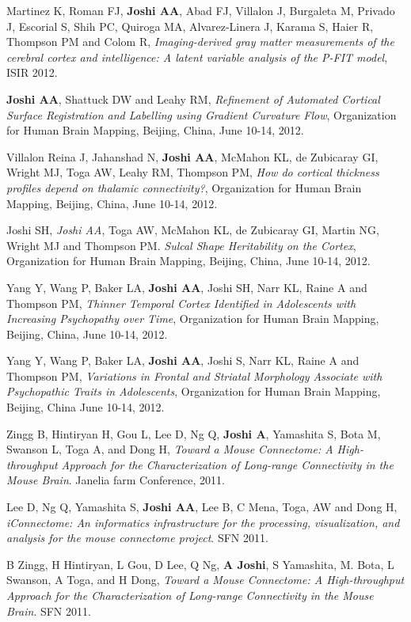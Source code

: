 \documentclass[overlapped,line,letterpaper]{res}
\begin{document}
\begin{resume}
Martinez K, Roman FJ, \textbf{Joshi AA}, Abad FJ, Villalon J, Burgaleta M, Privado J, Escorial S, Shih PC, Quiroga MA, Alvarez-Linera J, Karama S, Haier R, Thompson PM and Colom R, \textit{Imaging-derived gray matter measurements of the cerebral cortex and intelligence: A latent variable analysis of the P-FIT model}, ISIR 2012.

\textbf{Joshi AA}, Shattuck DW and Leahy RM, \textit{Refinement of Automated Cortical Surface Registration and Labelling using Gradient Curvature Flow}, Organization for Human Brain Mapping, Beijing, China, June 10-14, 2012.

Villalon Reina J, Jahanshad N, \textbf{Joshi AA}, McMahon KL, de Zubicaray GI, Wright MJ, Toga AW, Leahy RM, Thompson PM, \textit{How do cortical thickness profiles depend on thalamic connectivity?}, Organization for Human Brain Mapping, Beijing, China, June 10-14, 2012.

Joshi SH, \textit{Joshi AA}, Toga AW, McMahon KL, de Zubicaray GI, Martin NG, Wright MJ and Thompson PM. \textit{Sulcal Shape Heritability on the Cortex}, Organization for Human Brain Mapping, Beijing, China, June 10-14, 2012.

Yang Y, Wang P, Baker LA, \textbf{Joshi AA}, Joshi SH, Narr KL, Raine A and Thompson PM, \textit{Thinner Temporal Cortex Identified in Adolescents with Increasing Psychopathy over Time}, Organization for Human Brain Mapping, Beijing, China, June 10-14, 2012.

Yang Y, Wang P, Baker LA, \textbf{Joshi AA}, Joshi S, Narr KL, Raine A and Thompson PM, \textit{Variations in Frontal and Striatal Morphology Associate with Psychopathic Traits in Adolescents}, Organization for Human Brain Mapping, Beijing, China June 10-14, 2012.

Zingg B, Hintiryan H, Gou L, Lee D, Ng Q, \textbf{Joshi A}, Yamashita S, Bota M, Swanson L, Toga A, and Dong H, \textit{Toward a Mouse Connectome: A High-throughput Approach for the Characterization of Long-range Connectivity in the Mouse Brain}. Janelia farm Conference, 2011.

Lee D, Ng Q, Yamashita S, \textbf{Joshi AA}, Lee B, C Mena, Toga, AW and Dong H, \textit{iConnectome: An informatics infrastructure for the processing, visualization, and analysis for the mouse connectome project}. SFN 2011.

B Zingg, H Hintiryan, L Gou, D Lee, Q Ng, \textbf{A Joshi}, S Yamashita, M. Bota, L Swanson, A Toga, and H Dong, \textit{Toward a Mouse Connectome: A High-throughput Approach for the Characterization of Long-range Connectivity in the Mouse Brain}. SFN 2011.


\end{resume}
\end{document}

